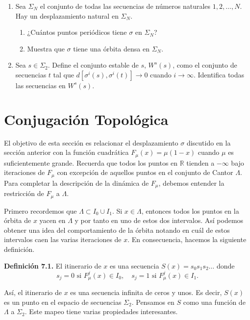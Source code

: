 \documentclass[10pt,a4paper]{book}
\begin{document}
\begin{enumerate}
    \item Sea $\Sigma_N$ el conjunto de todas las secuencias de números naturales $1, 2, \ldots, N$. Hay un desplazamiento natural en $\Sigma_N$.
    \begin{enumerate}
        \item ¿Cuántos puntos periódicos tiene $\sigma$ en $\Sigma_N$?
        \item Muestra que $\sigma$ tiene una órbita densa en $\Sigma_N$.
    \end{enumerate}

    \item Sea $s \in \Sigma_2$. Define el conjunto estable de $s$, $W^s(s)$, como el conjunto de secuencias $t$ tal que $d[\sigma^i(s), \sigma^i(t)] \to 0$ cuando $i \to \infty$. Identifica todas las secuencias en $W^s(s)$.
\end{enumerate}

\newpage

\section{Conjugación Topológica}

El objetivo de esta sección es relacionar el desplazamiento $\sigma$ discutido en la sección anterior con la función cuadrática $F_\mu(x) = \mu(1 - x)$ cuando $\mu$ es suficientemente grande. Recuerda que todos los puntos en $\mathbb{R}$ tienden a $-\infty$ bajo iteraciones de $F_\mu$ con excepción de aquellos puntos en el conjunto de Cantor $\Lambda$. Para completar la descripción de la dinámica de $F_\mu$, debemos entender la restricción de $F_\mu$ a $\Lambda$.

Primero recordemos que $\Lambda \subset I_0 \cup I_1$. Si $x \in \Lambda$, entonces todos los puntos en la órbita de $x$ yacen en $\Lambda$ y por tanto en uno de estos dos intervalos. Así podemos obtener una idea del comportamiento de la órbita notando en cuál de estos intervalos caen las varias iteraciones de $x$. En consecuencia, hacemos la siguiente definición.

\textbf{Definición 7.1.} El itinerario de $x$ es una secuencia $S(x) = s_0 s_1 s_2 \ldots$ donde
\[
s_j = 0 \text{ si } F_\mu^j(x) \in I_0, \quad s_j = 1 \text{ si } F_\mu^j(x) \in I_1.
\]

Así, el itinerario de $x$ es una secuencia infinita de ceros y unos. Es decir, $S(x)$ es un punto en el espacio de secuencias $\Sigma_2$. Pensamos en $S$ como una función de $\Lambda$ a $\Sigma_2$. Este mapeo tiene varias propiedades interesantes.
\end{document}
